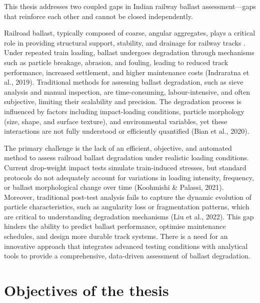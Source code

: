 This thesis addresses two coupled gaps in Indian railway ballast assessment---gaps that reinforce each other and cannot be closed independently.

Railroad ballast, typically composed of coarse, angular aggregates, plays a critical role in providing structural support, stability, and drainage for railway tracks \citep{selig1994}. Under repeated train loading, ballast undergoes degradation through mechanisms such as particle breakage, abrasion, and fouling, leading to reduced track performance, increased settlement, and higher maintenance costs (Indraratna et al., 2019). Traditional methods for assessing ballast degradation, such as sieve analysis and manual inspection, are time-consuming, labour-intensive, and often subjective, limiting their scalability and precision. The degradation process is influenced by factors including impact-loading conditions, particle morphology (size, shape, and surface texture), and environmental variables, yet these interactions are not fully understood or efficiently quantified (Bian et al., 2020).

The primary challenge is the lack of an efficient, objective, and automated method to assess railroad ballast degradation under realistic loading conditions. Current drop-weight impact tests simulate train-induced stresses, but standard protocols do not adequately account for variations in loading intensity, frequency, or ballast morphological change over time (Koohmishi \& Palassi, 2021). Moreover, traditional post-test analysis fails to capture the dynamic evolution of particle characteristics, such as angularity loss or fragmentation patterns, which are critical to understanding degradation mechanisms (Liu et al., 2022). This gap hinders the ability to predict ballast performance, optimise maintenance schedules, and design more durable track systems. There is a need for an innovative approach that integrates advanced testing conditions with analytical tools to provide a comprehensive, data-driven assessment of ballast degradation.

\section{Objectives of the thesis}
\label{sec:objectives}

